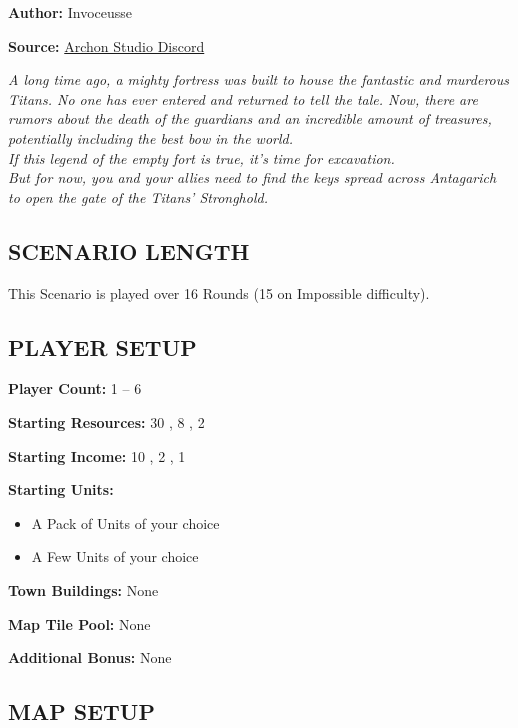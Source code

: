 
\begin{multicols*}{2}

\textbf{Author:} Invoceusse

\textbf{Source:} \href{https://discord.com/channels/740870068178649108/1219333721019256943}{Archon Studio Discord}

\textit{A long time ago, a mighty fortress was built to house the fantastic and murderous Titans.
  No one has ever entered and returned to tell the tale.
  Now, there are rumors about the death of the guardians and an incredible amount of treasures, potentially including the best bow in the world.\\
  If this legend of the empty fort is true, it's time for excavation.\\
  But for now, you and your allies need to find the keys spread across Antagarich to open the gate of the Titans' Stronghold.
}
\subsection*{\MakeUppercase{Scenario Length}}

This Scenario is played over 16 Rounds (15 on Impossible difficulty).

\subsection*{\MakeUppercase{Player Setup}}

\textbf{Player Count:} 1 -- 6

\textbf{Starting Resources:} 30 , 8 , 2 

\textbf{Starting Income:} 10 , 2 , 1 

\textbf{Starting Units:}
\begin{itemize}
  \item A Pack of  Units of your choice
  \item A Few  Units of your choice
\end{itemize}

\textbf{Town Buildings:} None

\textbf{Map Tile Pool:} None

\textbf{Additional Bonus:} None

\subsection*{\MakeUppercase{Map Setup}}


\end{multicols*}
